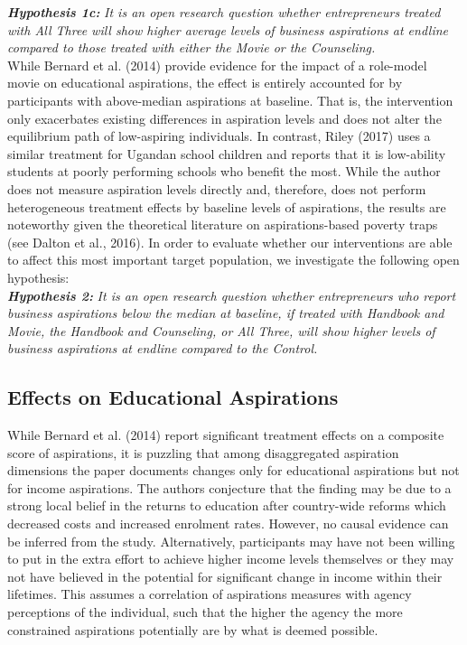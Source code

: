 \documentclass[11.5pt]{article}
\begin{document}
\noindent \emph{\textbf{Hypothesis 1c:}} \emph{It is an open research question whether entrepreneurs treated with \emph{All Three} will show higher average levels of business aspirations at endline compared to those treated with either the \emph{Movie} or the \emph{Counseling}.} \\

While Bernard et al. (2014) provide evidence for the impact of a role-model movie on educational aspirations, the effect is entirely accounted for by participants with above-median aspirations at baseline. That is, the intervention only exacerbates existing differences in aspiration levels and does not alter the equilibrium path of low-aspiring individuals. In contrast, Riley (2017) uses a similar treatment for Ugandan school children and reports that it is low-ability students at poorly performing schools who benefit the most. While the author does not measure aspiration levels directly and, therefore, does not perform heterogeneous treatment effects by baseline levels of aspirations, the results are noteworthy given the theoretical literature on aspirations-based poverty traps (see Dalton et al., 2016). In order to evaluate whether our interventions are able to affect this most important target population, we investigate the following open hypothesis: \\

\noindent \emph{\textbf{Hypothesis 2:}} \emph{It is an open research question whether entrepreneurs who report business aspirations below the median at baseline, if treated with \emph{Handbook and Movie}, the \emph{Handbook and Counseling}, or \emph{All Three}, will show higher levels of business aspirations at endline compared to the \emph{Control}.} \\

\subsection{Effects on Educational Aspirations}

While Bernard et al. (2014) report significant treatment effects on a composite score of aspirations, it is puzzling that among disaggregated aspiration dimensions the paper documents changes only for educational aspirations but not for income aspirations. The authors conjecture that the finding may be due to a strong local belief in the returns to education after country-wide reforms which decreased costs and increased enrolment rates. However, no causal evidence can be inferred from the study. Alternatively, participants may have not been willing to put in the extra effort to achieve higher income levels themselves or they may not have believed in the potential for significant change in income within their lifetimes. This assumes a correlation of aspirations measures with agency perceptions of the individual, such that the higher the agency the more constrained aspirations potentially are by what is deemed possible. 
\end{document}
